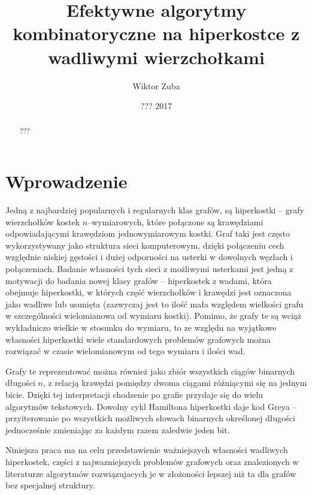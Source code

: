 \documentclass{pracamgr}
\author{Wiktor Zuba}
\title{Efektywne algorytmy kombinatoryczne na hiperkostce z wadliwymi wierzchołkami}
\date{??? 2017}
\begin{document}
\maketitle

\begin{abstract}
???
\end{abstract}


\tableofcontents



 \chapter*{Wprowadzenie}
  Jedną z najbardziej popularnych i regularnych klas grafów, są hiperkostki -- grafy wierzchołków kostek $n$--wymiarowych,
  które połączone są krawędziami odpowiadającymi krawędziom jednowymiarowym kostki.
  Graf taki jest często wykorzystywany jako struktura sieci komputerowym, dzięki połączeniu cech względnie niskiej gęstości i dużej odporności na usterki
  w dowolnych węzłach i połączeniach.
  Badanie własności tych sieci z możliwymi usterkami jest jedną z motywacji do badania nowej klasy grafów -- hiperkostek z wadami, która obejmuje
  hiperkostki, w których część wierzchołków i krawędzi jest oznaczona jako wadliwe lub usunięta
  (zazwyczaj jest to ilość mała względem wielkości grafu w szczególności wielomianowa od wymiaru kostki).  
  Pomimo, że grafy te są wciąż wykładniczo wielkie w stosunku do wymiaru, to ze względu na wyjątkowe własności hiperkostki wiele standardowych
  problemów grafowych można rozwiązać w czasie wielomianowym od tego wymiaru i ilości wad.
  
  Grafy te reprezentować można również jako zbiór wszystkich ciągów binarnych długości $n$,
  z relacją krawędzi pomiędzy dwoma ciągami różniącymi się na jednym bicie.
  Dzięki tej interpretacji chodzenie po grafie przydaje się do wielu algorytmów tekstowych. Dowolny cykl Hamiltona hiperkostki
  daje kod Greya -- przyiterowanie po wszystkich możliwych słowach binarnych określonej długości jednocześnie zmieniając za każdym razem zaledwie jeden
  bit.\newline
  
  Niniejsza praca ma na celu przedstawienie ważniejszych własności wadliwych hiperkostek, części z najwazniejszych problemów grafowych
  oraz znalezionych w literaturze algorytmów rozwiązujacych je w złożoności lepszej niż ta dla grafów bez specjalnej struktury.
  
\end{document}

